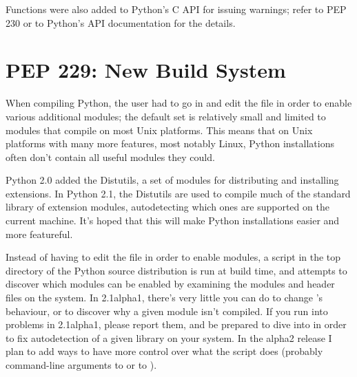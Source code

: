 \documentclass{howto}
\begin{document}
Functions were also added to Python's C API for issuing warnings;
refer to PEP 230 or to Python's API documentation for the details.

\begin{seealso}

\end{seealso}
    
\section{PEP 229: New Build System}

When compiling Python, the user had to go in and edit the
 file in order to enable various additional
modules; the default set is relatively small and limited to modules
that compile on most Unix platforms.  This means that on Unix
platforms with many more features, most notably Linux, Python
installations often don't contain all useful modules they could.

Python 2.0 added the Distutils, a set of modules for distributing and
installing extensions.  In Python 2.1, the Distutils are used to
compile much of the standard library of extension modules,
autodetecting which ones are supported on the current machine.  It's
hoped that this will make Python installations easier and more
featureful.

Instead of having to edit the  file in order to
enable modules, a  script in the top directory of the
Python source distribution is run at build time, and attempts to
discover which modules can be enabled by examining the modules and
header files on the system.  In 2.1alpha1, there's very little you can
do to change 's behaviour, or to discover why a given
module isn't compiled.  If you run into problems in 2.1alpha1, please
report them, and be prepared to dive into  in order to
fix autodetection of a given library on your system.  In the alpha2
release I plan to add ways to have more control over what the script
does (probably command-line arguments to  or to
).
\end{document}
